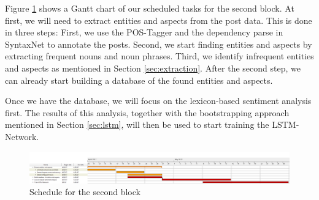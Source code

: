 \documentclass[10pt,a4paper]{article}
\begin{document}
	Figure \ref{fig:gantt} shows a Gantt chart of our scheduled tasks for the second block. At first, we will need to extract entities and aspects from the post data. This is done in three steps: First, we use the POS-Tagger and the dependency parse in SyntaxNet to annotate the posts. Second, we start finding entities and aspects by extracting frequent nouns and noun phrases. Third, we identify infrequent entities and aspects as mentioned in Section \ref{sec:extraction}. After the second step, we can already start building a database of the found entities and aspects.
	
	Once we have the database, we will focus on the lexicon-based sentiment analysis first. The results of this analysis, together with the bootstrapping approach mentioned in Section \ref{sec:lstm}, will then be used to start training the LSTM-Network.
	
	\begin{figure}[h]
		\centering
		\includegraphics[width=\linewidth]{data/gantt}
		\caption{Schedule for the second block}
		\label{fig:gantt}
	\end{figure}

	\newpage

	\nocite{DBLP:journals/corr/AndorAWSPGPC16}
	\nocite{Liu12sentimentanalysis}
	\nocite{Zhang2014}
	\nocite{pennington2014glove}
	\nocite{syntaxnet}
	\nocite{Ding:2008:HLA:1341531.1341561}

	
	
\end{document}

